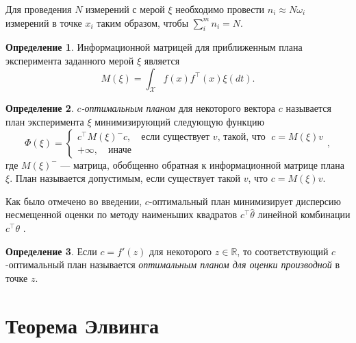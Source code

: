 \documentclass[specialist,
               substylefile = spbu.rtx,
               subf,href,colorlinks=true, 12pt]{disser}
\theoremstyle{definition}
\newtheorem{definition}{Определение}
\begin{document}
  Для проведения $N$ измерений с мерой $\xi$ необходимо провести $n_i \approx N \omega_i$ измерений в точке $x_i$ таким образом, чтобы $\sum^m_i n_i = N$.

  \begin{definition}
  Информационной матрицей для приближенным плана эксперимента заданного мерой $\xi$ является 
  \begin{equation*}
    M(\xi) = \int_{\mathcal{X}} f(x) f^\top(x) \xi (dt).
  \end{equation*}
  \end{definition}
  
  \begin{definition}
  \label{def:coptim}
  \textit{$c$-оптимальным планом} для некоторого вектора $c$ называется план эксперимента $\xi$ минимизирующий следующую функцию
  \begin{equation}
  \label{eq:cdef}
    \Phi(\xi) = \begin{cases}
      c^\top M(\xi)^{-} c, \quad \text{если существует } v \text{, такой, что } \; c = M(\xi) v\\
      +\infty, \quad  \text{иначе}
    \end{cases},
  \end{equation}
  где $M(\xi)^{-}$ --- матрица, обобщенно обратная к информационной матрице плана $\xi$.
  План называется допустимым, если существует такой $v$, что $c = M(\xi) v$.
  \end{definition}
  
  Как было отмечено во введении, $c$-оптимальный план минимизирует дисперсию несмещенной оценки по методу наименьших квадратов $c^\top \hat{\theta}$ линейной комбинации $c^\top \theta$ \cite{dette1993_2}.
 
  \begin{definition}
  Если $c = f'(z)$ для некоторого $z \in \mathbb{R}$, то соответствующий $c$-оптимальный план называется \textit{оптимальным планом для оценки производной} в точке $z$.
  \end{definition}
  
  \section{Теорема Элвинга}
  
\end{document}
